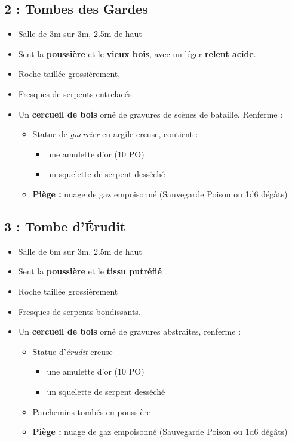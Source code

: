 \subsection{2 : Tombes des Gardes}\label{n1:s2}
\begin{itemize}
  \item Salle de 3m sur 3m, 2.5m de haut
  \item Sent la \textbf{poussière} et le \textbf{vieux bois}, avec un léger \textbf{relent acide}.
  \item Roche taillée grossièrement,
  \item Fresques de serpents entrelacés.
  \item Un \textbf{cercueil de bois} orné de gravures de scènes de bataille. Renferme :
  \begin{itemize}
    \item Statue de \emph{guerrier} en argile creuse, contient :
    \begin{itemize}
      \item une amulette d'or (10 PO)
      \item un squelette de serpent desséché
    \end{itemize}
    \item \textbf{Piège :} nuage de gaz empoisonné (Sauvegarde Poison ou 1d6 dégâts)
  \end{itemize}
\end{itemize}

\vfill*\columnbreak
\subsection{3 : Tombe d'Érudit}\label{n1:s3}
\begin{itemize}
  \item Salle de 6m sur 3m, 2.5m de haut
  \item Sent la \textbf{poussière} et le \textbf{tissu putréfié}
  \item Roche taillée grossièrement
  \item Fresques de serpents bondissants.
  \item Un \textbf{cercueil de bois} orné de gravures abstraites, renferme :
  \begin{itemize}
    \item Statue d'\emph{érudit} creuse
    \begin{itemize}
      \item une amulette d'or (10 PO)
      \item un squelette de serpent desséché
    \end{itemize}
    \item Parchemins tombés en poussière
    \item \textbf{Piège :} nuage de gaz empoisonné (Sauvegarde Poison ou 1d6 dégâts)
  \end{itemize}
\end{itemize}

